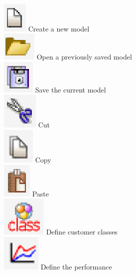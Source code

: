 \\
\includegraphics[scale=.5]{img/jsimg/new.eps} Create a new model\\
\includegraphics[scale=.5]{img/jsimg/open.eps} Open a previously saved
model\\
\includegraphics[scale=.5]{img/jsimg/save.eps} Save the current
model\\
\includegraphics[scale=.5]{img/jsimg/cut.eps} Cut\\
\includegraphics[scale=.5]{img/jsimg/copy}
Copy\\
\includegraphics[scale=.5]{img/jsimg/paste.eps} Paste\\
\includegraphics[scale=.5]{img/jsimg/definecustclasses.eps} Define customer
classes\\
\includegraphics[scale=.5]{img/jsimg/defineperformanceindices.eps} Define the performance
